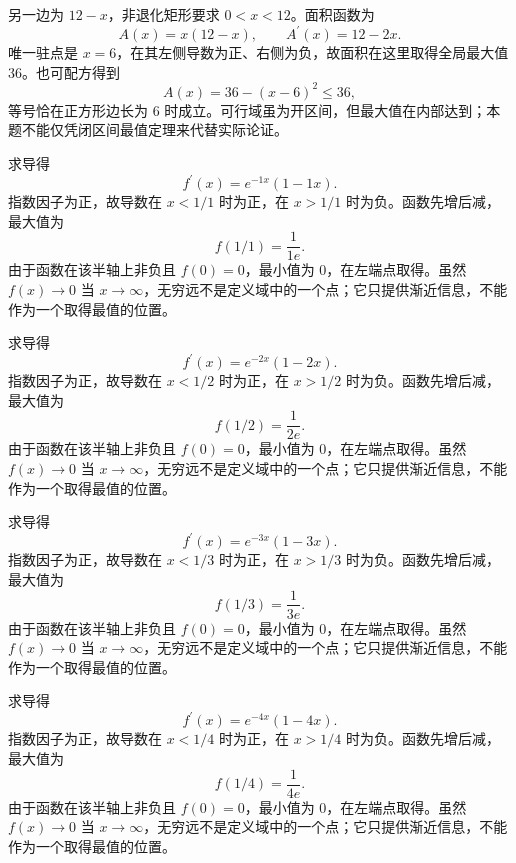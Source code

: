\documentclass[UTF8,12pt,a4paper,fontset=fandol]{ctexart}
\begin{document}
\begin{solve}\label{ans:c11q13}
另一边为 $12-x$，非退化矩形要求 $0<x<12$。面积函数为
\[
A(x)=x(12-x),\qquad A^{\prime}(x)=12-2x.
\]
唯一驻点是 $x=6$，在其左侧导数为正、右侧为负，故面积在这里取得全局最大值 $36$。也可配方得到
\[
A(x)=36-(x-6)^2\le 36,
\]
等号恰在正方形边长为 $6$ 时成立。可行域虽为开区间，但最大值在内部达到；本题不能仅凭闭区间最值定理来代替实际论证。
\end{solve}

\begin{solve}\label{ans:c11q14}
求导得
\[
f^{\prime}(x)=e^{-1x}(1-1x).
\]
指数因子为正，故导数在 $x<1/1$ 时为正，在 $x>1/1$ 时为负。函数先增后减，最大值为
\[
f(1/1)=\frac1{1e}.
\]
由于函数在该半轴上非负且 $f(0)=0$，最小值为 $0$，在左端点取得。虽然 $f(x)\to0$ 当 $x\to\infty$，无穷远不是定义域中的一个点；它只提供渐近信息，不能作为一个取得最值的位置。
\end{solve}

\begin{solve}\label{ans:c11q15}
求导得
\[
f^{\prime}(x)=e^{-2x}(1-2x).
\]
指数因子为正，故导数在 $x<1/2$ 时为正，在 $x>1/2$ 时为负。函数先增后减，最大值为
\[
f(1/2)=\frac1{2e}.
\]
由于函数在该半轴上非负且 $f(0)=0$，最小值为 $0$，在左端点取得。虽然 $f(x)\to0$ 当 $x\to\infty$，无穷远不是定义域中的一个点；它只提供渐近信息，不能作为一个取得最值的位置。
\end{solve}

\begin{solve}\label{ans:c11q16}
求导得
\[
f^{\prime}(x)=e^{-3x}(1-3x).
\]
指数因子为正，故导数在 $x<1/3$ 时为正，在 $x>1/3$ 时为负。函数先增后减，最大值为
\[
f(1/3)=\frac1{3e}.
\]
由于函数在该半轴上非负且 $f(0)=0$，最小值为 $0$，在左端点取得。虽然 $f(x)\to0$ 当 $x\to\infty$，无穷远不是定义域中的一个点；它只提供渐近信息，不能作为一个取得最值的位置。
\end{solve}

\begin{solve}\label{ans:c11q17}
求导得
\[
f^{\prime}(x)=e^{-4x}(1-4x).
\]
指数因子为正，故导数在 $x<1/4$ 时为正，在 $x>1/4$ 时为负。函数先增后减，最大值为
\[
f(1/4)=\frac1{4e}.
\]
由于函数在该半轴上非负且 $f(0)=0$，最小值为 $0$，在左端点取得。虽然 $f(x)\to0$ 当 $x\to\infty$，无穷远不是定义域中的一个点；它只提供渐近信息，不能作为一个取得最值的位置。
\end{solve}
\end{document}
